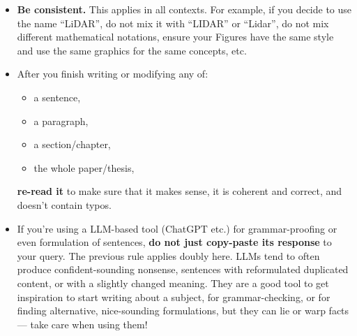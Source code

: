 \begin{itemize}
  \item
    \textbf{Be consistent.}
    This applies in all contexts.
    For example, if you decide to use the name \enquote{LiDAR}, do not mix it with \enquote{LIDAR} or \enquote{Lidar},
    do not mix different mathematical notations,
    ensure your Figures have the same style and use the same graphics for the same concepts,
    etc.
  \item 
    After you finish writing or modifying any of:
    \begin{itemize}
      \item a sentence,
      \item a paragraph,
      \item a section/chapter,
      \item the whole paper/thesis,
    \end{itemize}
    \textbf{re-read it} to make sure that it makes sense, it is coherent and correct, and doesn't contain typos.
  \item
    If you're using a LLM-based tool (ChatGPT etc.) for grammar-proofing or even formulation of sentences, \textbf{do not just copy-paste its response} to your query.
    The previous rule applies doubly here.
    LLMs tend to often produce confident-sounding nonsense, sentences with reformulated duplicated content, or with a slightly changed meaning.
    They are a good tool to get inspiration to start writing about a subject, for grammar-checking, or for finding alternative, nice-sounding formulations, but they can lie or warp facts --- take care when using them!

\end{itemize}
